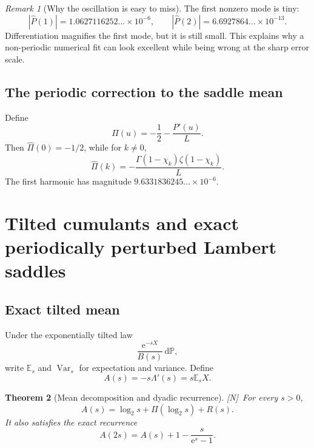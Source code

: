 \documentclass[11pt,oneside]{article}
\newtheorem{theorem}{Theorem}[section]
\theoremstyle{definition}
\theoremstyle{remark}
\newtheorem{remark}[theorem]{Remark}
\newcommand{\E}{\mathbb E}
\newcommand{\Prob}{\mathbb P}
\newcommand{\Var}{\operatorname{Var}}
\newcommand{\e}{\mathrm e}
\newcommand{\dd}{\,\mathrm d}
\newcommand{\statusN}{\textsf{[N]}}
\begin{document}
\begin{remark}[Why the oscillation is easy to miss]
The first nonzero mode is tiny:
\[
 |\widehat P(1)|=1.0627116252\ldots\times10^{-6},\qquad
 |\widehat P(2)|=6.6927864\ldots\times10^{-13}.
\]
Differentiation magnifies the first mode, but it is still small.  This explains why a
non-periodic numerical fit can look excellent while being wrong at the sharp error scale.
\end{remark}

\subsection{The periodic correction to the saddle mean}
Define
\begin{equation}
 \Pi(u)=-\frac12-\frac{P'(u)}L.                             \label{eq:Pi}
\end{equation}
Then $\widehat\Pi(0)=-1/2$, while for $k\ne0$,
\begin{equation}
 \boxed{
 \widehat\Pi(k)=-\frac{\Gamma(1-\chi_k)\zeta(1-\chi_k)}L.} \label{eq:Pi-Fourier}
\end{equation}
The first harmonic has magnitude $9.6331836245\ldots\times10^{-6}$.

\section{Tilted cumulants and exact periodically perturbed Lambert saddles}
\label{sec:saddle}

\subsection{Exact tilted mean}
Under the exponentially tilted law
\[
 \frac{\e^{-sX}}{B(s)}\dd\Prob,
\]
write $\E_s$ and $\Var_s$ for expectation and variance.  Define
\begin{equation}
 A(s)=-s\Lambda'(s)=s\E_sX.                                \label{eq:A}
\end{equation}

\begin{theorem}[Mean decomposition and dyadic recurrence]\label{thm:A-decomp}
\statusN\ For every $s>0$,
\begin{equation}
 \boxed{A(s)=\log_2s+\Pi(\log_2s)+R(s).}                   \label{eq:A-decomp}
\end{equation}
It also satisfies the exact recurrence
\begin{equation}
 \boxed{A(2s)=A(s)+1-\frac{s}{\e^s-1}.}                    \label{eq:A-recurrence}
\end{equation}
\end{theorem}
\end{document}
